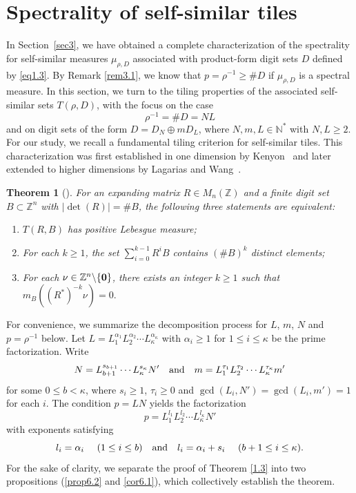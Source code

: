\documentclass[11pt]{article}
\newtheorem{theorem}{Theorem}[section]
\numberwithin{equation}{section}
\begin{document}
\section{Spectrality of self-similar tiles}\label{sec4}
In Section~\ref{sec3}, we have obtained a complete characterization of the spectrality for self-similar measures $\mu_{\rho,D}$ associated with product-form digit sets $D$ defined by \eqref{eq1.3}. By Remark \ref{rem3.1}, we know that $p=\rho^{-1}\ge \#D$ if $\mu_{\rho,D}$ is a spectral measure. 
In this section, we turn to the tiling properties of the associated self-similar sets $T(\rho, D)$, with the focus on the case 
$$\rho^{-1} = \#D = NL$$
 and on digit sets of the form $D = D_N \oplus m D_L$, where $N, m, L \in \mathbb{N}^*$ with $N, L \ge 2$.  For our study, we recall a fundamental tiling criterion for self-similar tiles. This characterization was first established in one dimension by Kenyon~\cite{Ken1992} and later extended to higher dimensions by Lagarias and Wang~\cite{Lag1997}.





\begin{theorem}[\cite{Lag1997}] \label{2.8}
	For an expanding matrix $R \in M_n(\mathbb{Z})$ and a finite digit set $B \subset \mathbb{Z}^n$ with $\vert \det(R) \vert = \# B$, the following three statements are equivalent:
	\begin{enumerate}[\rm(i)]
		\item $T(R,B)$ has positive Lebesgue measure;
		\item For each $k \ge 1$, the set $\sum^{k-1}_{i=0}R^{i}B$ contains $(\#B)^k$ distinct elements;
		\item For each $\nu \in \mathbb{Z}^n \backslash \{\bf{0}\}$, there exists an integer $k\ge 1$ such that $m_B((R^{\ast})^{-k}\nu)=0.$
	\end{enumerate}	
\end{theorem}
For convenience, we summarize the decomposition process for $L$, $m$, $N$ and $p=\rho^{-1}$ below.
Let $L = L_1^{\alpha_1} L_2^{\alpha_2} \cdots L_\kappa^{\alpha_\kappa}$ with $\alpha_i\geq 1$ for $1\leq i\leq\kappa$ be the prime factorization.  Write
\begin{equation}\label{4.6}
N=L_{b+1}^{s_{b+1}}\cdots L_{\kappa}^{s_{\kappa}}N'\quad {\rm{and}} \quad m = L_1^{\tau_1} L_2^{\tau_2} \cdots L_\kappa^{\tau_\kappa} m'
\end{equation}
for some $0\leq b<\kappa$, where $s_i\geq 1$, $\tau_i\geq0 $ and $\gcd(L_i,N')=\gcd(L_i,m')=1$ for each $i$. The condition $p=LN$ yields the factorization
\begin{equation}\label{4.7}
p = L_1^{l_1} L_2^{l_2} \cdots L_\kappa^{l_\kappa} N'
\end{equation}
with exponents satisfying
\begin{equation}\label{4.8}
l_i=\alpha_i~~~~(1\leq i\leq b) \quad {\rm{and}} \quad l_i=\alpha_i+s_i~~~~(b+1\leq i\leq \kappa).
\end{equation}
For the sake of clarity, we separate the proof of Theorem \ref{1.3} into two propositions (\ref{prop6.2} and \ref{cor6.1}), which collectively establish the theorem.
\end{document}
